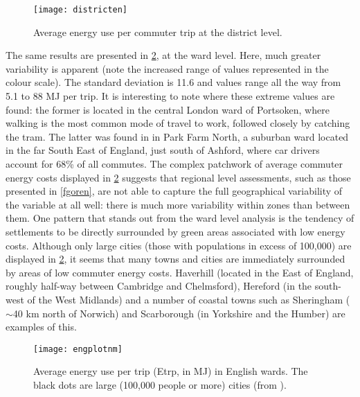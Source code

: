 \begin{figure}[htbp]
\begin{center}
    \texttt{[image: districten]}  \end{center}
  \caption[Average energy use per commuter trip at the district level]
  {Average energy use per commuter trip at the district level.}
 \label{fdistricten}
\end{figure}

The same results are presented in \cref{fengplotnm}, at the ward level.
Here, much greater variability is apparent (note the increased range of
values represented in the colour scale). The standard deviation is 11.6
and values range all the way from 5.1 to 88 MJ per trip.
It is interesting to note where these extreme values are found:
the former is located in the central London ward of
Portsoken, where walking is the most common mode of travel to work,
followed closely by catching the tram. The latter was
found in in Park Farm North,
a suburban ward located in the far South East of England, just south of
Ashford, where car drivers account for 68\% of all commutes. The complex
patchwork of average  commuter energy costs displayed in \cref{fengplotnm}
suggests that regional level assessments, such as those
presented in \cref{fgoren}, are not able to capture the full geographical
variability of the variable at all well: there is much more variability
within zones than between them. One pattern that stands out from the ward level
analysis is the tendency of settlements to be directly surrounded by green areas
associated with low energy costs. Although only large cities (those with
populations in excess of 100,000) are displayed in
\cref{fengplotnm}, it seems that many towns and cities are immediately surrounded
by areas of low commuter energy costs. Haverhill (located in the East of
England, roughly half-way between Cambridge and Chelmsford),
Hereford (in the south-west of the West Midlands) and a number of coastal
towns such as  Sheringham ($\sim$40 km north of Norwich) and Scarborough
(in Yorkshire and the Humber) are examples of this.
\begin{figure}[htbp]
\begin{center}
    \texttt{[image: engplotnm]}  \end{center}
  \caption[Average energy use per trip (Etrp, in MJ) in English wards]
  {Average energy use per trip (Etrp, in MJ) in English wards.
  The black dots are large (100,000 people or more) cities (from
  \citet{Brownrigg2013}).}
 \label{fengplotnm}
\end{figure}

